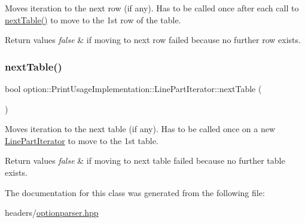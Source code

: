 Moves iteration to the next row (if any). Has to be called once after each call to \hyperlink{classoption_1_1PrintUsageImplementation_1_1LinePartIterator_afe43ca12d399ed3c871e4dc5bf63356e}{next\+Table()} to move to the 1st row of the table. 


\begin{DoxyRetVals}{Return values}
{\em false} & if moving to next row failed because no further row exists. \\
\hline
\end{DoxyRetVals}
\mbox{\label{classoption_1_1PrintUsageImplementation_1_1LinePartIterator_afe43ca12d399ed3c871e4dc5bf63356e}} 
\subsubsection{\texorpdfstring{next\+Table()}{nextTable()}}
{\footnotesize\ttfamily bool option\+::\+Print\+Usage\+Implementation\+::\+Line\+Part\+Iterator\+::next\+Table (\begin{DoxyParamCaption}{ }\end{DoxyParamCaption})\hspace{0.3cm}{\ttfamily [inline]}}



Moves iteration to the next table (if any). Has to be called once on a new \hyperlink{classoption_1_1PrintUsageImplementation_1_1LinePartIterator}{Line\+Part\+Iterator} to move to the 1st table. 


\begin{DoxyRetVals}{Return values}
{\em false} & if moving to next table failed because no further table exists. \\
\hline
\end{DoxyRetVals}


The documentation for this class was generated from the following file\+:\begin{DoxyCompactItemize}
\item 
headers/\hyperlink{optionparser_8hpp}{optionparser.\+hpp}\end{DoxyCompactItemize}
